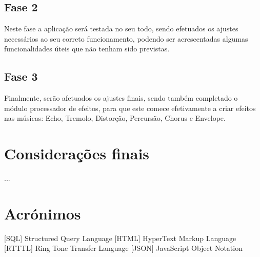 \documentclass{report}
\begin{document}
\section{Fase 2}
Neste fase a aplicação será testada no seu todo, sendo efetuados os ajustes necessários ao seu correto funcionamento, podendo ser acrescentadas algumas funcionalidades úteis que não tenham sido previstas.
\section{Fase 3}
Finalmente, serão afetuados os ajustes finais, sendo também completado o módulo processador de efeitos, para que este comece efetivamente a criar efeitos nas músicas: Echo, Tremolo, Distorção, Percursão, Chorus e Envelope.

\chapter{Considerações finais}
\label{chap.finais}

...


\chapter*{Acrónimos}
\begin{acronym}
[SQL] {Structured Query Language}
 [HTML] {HyperText Markup Language}
 [RTTTL] {Ring Tone Transfer Language}
 [JSON] {JavaScript Object Notation}

\end{acronym}


\printbibliography
\end{document}
